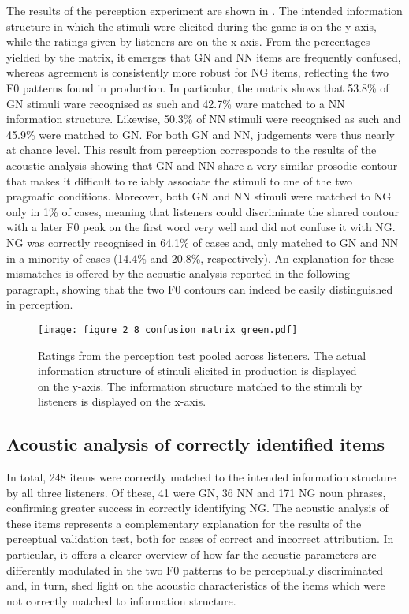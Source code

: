 The results of the perception experiment are shown in . The intended information structure in which the stimuli were elicited during the game is on the y-axis, while the ratings given by listeners are on the x-axis. From the percentages yielded by the matrix, it emerges that GN and NN items are frequently confused, whereas agreement is consistently more robust for NG items, reflecting the two F0 patterns found in production. In particular, the matrix shows that 53.8\% of GN stimuli ware recognised as such and 42.7\% ware matched to a NN information structure. Likewise, 50.3\% of NN stimuli were recognised as such and 45.9\% were matched to GN. For both GN and NN, judgements were thus nearly at chance level. This result from perception corresponds to the results of the acoustic analysis showing that GN and NN share a very similar prosodic contour that makes it difficult to reliably associate the stimuli to one of the two pragmatic conditions. Moreover, both GN and NN stimuli were matched to NG only in 1\% of cases, meaning that listeners could discriminate the shared contour with a later F0 peak on the first word very well and did not confuse it with NG. NG was correctly recognised in 64.1\% of cases and, only matched to GN and NN in a minority of cases (14.4\% and 20.8\%, respectively). An explanation for these mismatches is offered by the acoustic analysis reported in the following paragraph, showing that the two F0 contours can indeed be easily distinguished in perception.


\begin{figure}
\texttt{[image: figure\_2\_8\_confusion matrix\_green.pdf]}
\caption{Ratings from the perception test pooled across listeners. The actual information structure of stimuli elicited in production is displayed on the y-axis. The information structure matched to the stimuli by listeners is displayed on the x-axis.}
\label{fig:2.8}
\end{figure}

\subsection{Acoustic analysis of correctly identified items}
\label{sec:2.4.3}
In total, 248 items were correctly matched to the intended information structure by all three listeners. Of these, 41 were GN, 36 NN and 171 NG noun phrases, confirming greater success in correctly identifying NG. The acoustic analysis of these items represents a complementary explanation for the results of the perceptual validation test, both for cases of correct and incorrect attribution. In particular, it offers a clearer overview of how far the acoustic parameters are differently modulated in the two F0 patterns to be perceptually discriminated and, in turn, shed light on the acoustic characteristics of the items which were not correctly matched to information structure.

